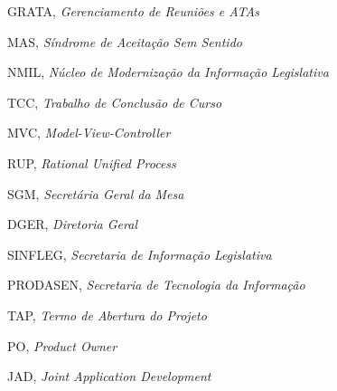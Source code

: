 \begin{siglas}
	\item GRATA, \textit{Gerenciamento de Reuniões e ATAs}
  	\item MAS, \textit{Síndrome de Aceitação Sem Sentido}
  	\item NMIL, \textit{Núcleo de Modernização da Informação Legislativa}
  	\item TCC, \textit{Trabalho de Conclusão de Curso}
  	\item MVC, \textit{Model-View-Controller}
  	\item RUP, \textit{Rational Unified Process}
  	\item SGM, \textit{Secretária Geral da Mesa}
  	\item DGER, \textit{Diretoria Geral}
  	\item SINFLEG, \textit{Secretaria de Informação Legislativa}
  	\item PRODASEN, \textit{Secretaria de Tecnologia da Informação}
  	\item TAP, \textit{Termo de Abertura do Projeto}
  	\item PO, \textit{Product Owner}
  	\item JAD, \textit{Joint Application Development}
\end{siglas}